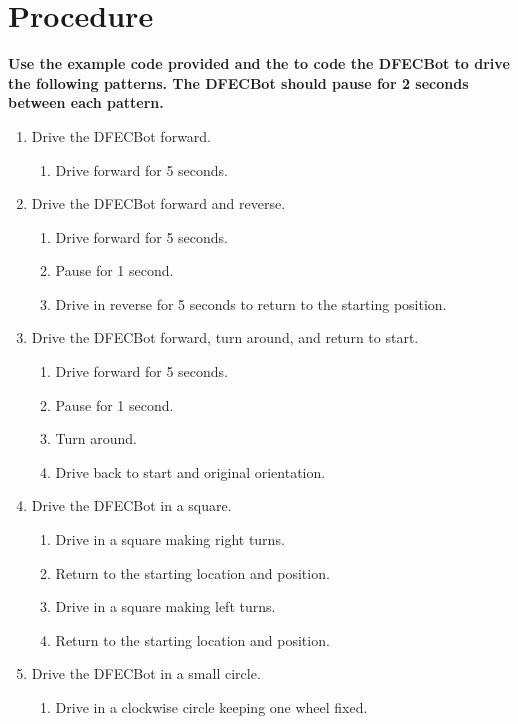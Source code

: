 \documentclass{handout}
\begin{document}
	\newpage
	\clearpage
	\pagebreak
	
	\section{Procedure}
	\textbf{Use the example code provided and the  to code the DFECBot to drive the following patterns. The DFECBot should pause for 2 seconds between each pattern.}
		
	\begin{enumerate}
		\item Drive the DFECBot forward.
		\begin{enumerate}
			\item Drive forward for 5 seconds.
		\end{enumerate}
		\item Drive the DFECBot forward and reverse.
		\begin{enumerate}
			\item Drive forward for 5 seconds.
			\item Pause for 1 second.
			\item Drive in reverse for 5 seconds to return to the starting position.
		\end{enumerate}
		\item Drive the DFECBot forward, turn around, and return to start.
		\begin{enumerate}
			\item Drive forward for 5 seconds.
			\item Pause for 1 second.
			\item Turn around.
			\item Drive back to start and original orientation.
		\end{enumerate}
		\item Drive the DFECBot in a square.
		\begin{enumerate}
			\item Drive in a square making right turns.
			\item Return to the starting location and position.
			\item Drive in a square making left turns.
			\item Return to the starting location and position.
		\end{enumerate}
		\item Drive the DFECBot in a small circle.
		\begin{enumerate}
			\item Drive in a clockwise circle keeping one wheel fixed.

\end{enumerate}
\end{enumerate}
\end{document}
